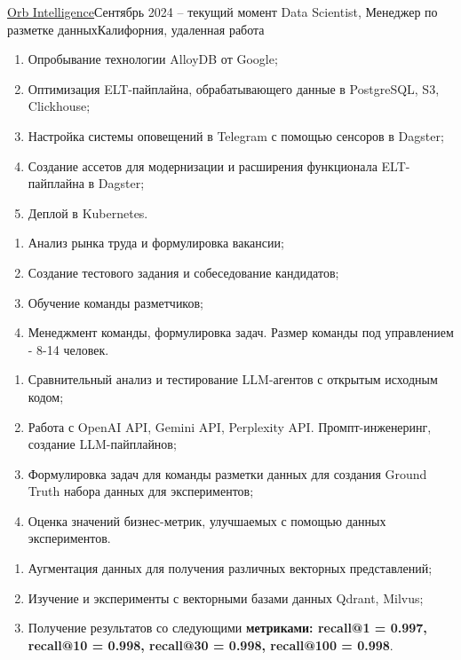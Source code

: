 \documentclass[letterpaper,11pt]{article}
\begin{document}
    \resumeSubheading
    {\href{link_to_company}{\underline{Orb Intelligence}}}{Сентябрь 2024 -- текущий момент}
    {Data Scientist, Менеджер по разметке данных}{Калифорния, удаленная работа}
    \resumeItemListStart
            \begin{enumerate}
                \item Опробывание технологии AlloyDB от Google;
                \item Оптимизация ELT-пайплайна, обрабатывающего данные в PostgreSQL, S3, Clickhouse;
                \item Настройка системы оповещений в Telegram с помощью сенсоров в Dagster;
                \item Создание ассетов для модернизации и расширения функционала ELT-пайплайна в Dagster;
                \item Деплой в Kubernetes.
            \end{enumerate}
            \begin{enumerate}
                \item Анализ рынка труда и формулировка вакансии;
                \item Создание тестового задания и собеседование кандидатов;
                \item Обучение команды разметчиков;
                \item Менеджмент команды, формулировка задач. Размер команды под управлением - 8-14 человек.
            \end{enumerate}
            \begin{enumerate}
                \item Сравнительный анализ и тестирование LLM-агентов с открытым исходным кодом;
                \item Работа с OpenAI API, Gemini API, Perplexity API. Промпт-инженеринг, создание LLM-пайплайнов;
                \item Формулировка задач для команды разметки данных для создания Ground Truth набора данных для экспериментов;
                \item Оценка значений бизнес-метрик, улучшаемых с помощью данных экспериментов.
            \end{enumerate}
            \begin{enumerate}
                \item Аугментация данных для получения различных векторных представлений;
                \item Изучение и эксперименты с векторными базами данных Qdrant, Milvus;
                \item Получение результатов со следующими \textbf{метриками: recall@1 = 0.997, recall@10 = 0.998, recall@30 = 0.998, recall@100 = 0.998}.
            \end{enumerate}
    \resumeItemListEnd
    
\end{document}

